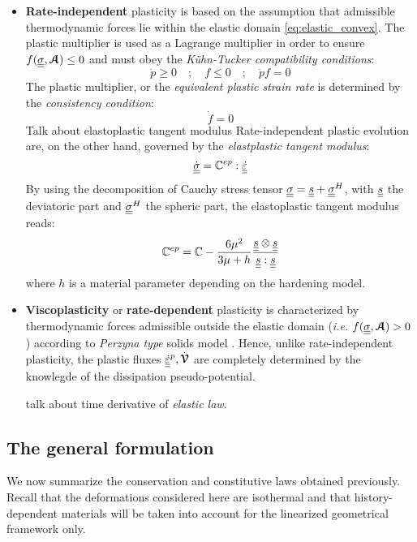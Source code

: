 \begin{itemize}
\item \textbf{Rate-independent} plasticity is based on the assumption that admissible thermodynamic forces lie within the elastic domain \eqref{eq:elastic_convex}. The plastic multiplier is used as a Lagrange multiplier in order to ensure $f({\underline{\underline{\sigma}}},{\boldsymbol{\mathcal{A}}})\leq 0$ and must obey the \textit{K{\"u}hn-Tucker compatibility conditions}:
\begin{equation}
  \label{eq:Kuhn_Tucker}
  \dot{p} \geq 0 \quad ; \quad f \leq 0 \quad ; \quad \dot{p}f =0 
\end{equation}
The plastic multiplier, or the \textit{equivalent plastic strain rate} is determined by the \textit{consistency condition}:
\begin{equation}
  \label{eq:consistency_condition}
  \dot{f}=0
\end{equation}
Talk about elastoplastic tangent modulus Rate-independent plastic evolution are, on the other hand, governed by the \textit{elastplastic tangent modulus}:
\begin{equation}
  \label{eq:HPP_tangent_plasticity}
  {\underline{\underline{\dot{\sigma}}}}=\mathbb{C}^{ep}:{\underline{\underline{\dot{\varepsilon}}}}
\end{equation}
By using the decomposition of Cauchy stress tensor ${\underline{\underline{\sigma}}}={\underline{\underline{s}}} + {\underline{\underline{\sigma}}}^H$, with ${\underline{\underline{s}}}$ the deviatoric part and ${\underline{\underline{\sigma}}}^H$ the spheric part, the elastoplastic tangent modulus reads: 
\begin{equation}
  \label{eq:HPP_tangent_plasticity_explicit}
  \mathbb{C}^{ep}=\mathbb{C} - \frac{6\mu^2}{3\mu +h} \frac{{\underline{\underline{s}}}\otimes {\underline{\underline{s}}}}{{\underline{\underline{s}}}:{\underline{\underline{s}}}}
\end{equation}
where $h$ is a material parameter depending on the hardening model.
\item \textbf{Viscoplasticity} or \textbf{rate-dependent} plasticity is characterized by thermodynamic forces admissible outside the elastic domain (\textit{i.e.} $f({\underline{\underline{\sigma}}},{\boldsymbol{\mathcal{A}}})>0$) according to \textit{Perzyna type} solids model \cite[p.58]{Simo}. Hence, unlike rate-independent plasticity, the plastic fluxes ${\underline{\underline{\dot{\varepsilon}}}}^p, \dot{{\boldsymbol{\mathcal{V}}}}$ are completely determined by the knowlegde of the dissipation pseudo-potential.

  talk about time derivative of \textit{elastic law}.
\end{itemize}

\subsection{The general formulation}
We now summarize the conservation and constitutive laws obtained previously. Recall that the deformations considered here are isothermal and that history-dependent materials will be taken into account for the linearized geometrical framework only. 
